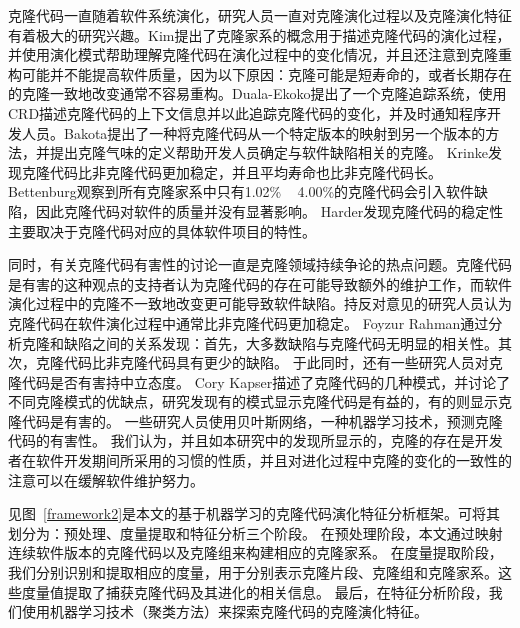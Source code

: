 克隆代码一直随着软件系统演化，研究人员一直对克隆演化过程以及克隆演化特征有着极大的研究兴趣。Kim提出了克隆家系的概念用于描述克隆代码的演化过程，并使用演化模式帮助理解克隆代码在演化过程中的变化情况，并且还注意到克隆重构可能并不能提高软件质量，因为以下原因：克隆可能是短寿命的，或者长期存在的克隆一致地改变通常不容易重构\cite{kim2005empirical}。Duala-Ekoko提出了一个克隆追踪系统，使用CRD描述克隆代码的上下文信息并以此追踪克隆代码的变化，并及时通知程序开发人员\cite{duala2010clone}。Bakota提出了一种将克隆代码从一个特定版本的映射到另一个版本的方法，并提出克隆气味的定义帮助开发人员确定与软件缺陷相关的克隆\cite{bakota2011tracking,bakota2007clone}。 Krinke发现克隆代码比非克隆代码更加稳定，并且平均寿命也比非克隆代码长\cite{krinke2008cloned}。 Bettenburg观察到所有克隆家系中只有1.02\% ~ 4.00\%的克隆代码会引入软件缺陷，因此克隆代码对软件的质量并没有显著影响\cite{bettenburg2009empirical}。  Harder发现克隆代码的稳定性主要取决于克隆代码对应的具体软件项目的特性\cite{harder2013cloned}。

同时，有关克隆代码有害性的讨论一直是克隆领域持续争论的热点问题。克隆代码是有害的这种观点的支持者认为克隆代码的存在可能导致额外的维护工作，而软件演化过程中的克隆不一致地改变更可能导致软件缺陷\cite{inoue2012experience}。持反对意见的研究人员认为克隆代码在软件演化过程中通常比非克隆代码更加稳定\cite{krinke2008cloned}。 Foyzur Ra​​hman通过分析克隆和缺陷之间的关系发现：首先，大多数缺陷与克隆代码无明显的相关性。其次，克隆代码比非克隆代码具有更少的缺陷\cite{rahman2012clones}。
 于此同时，还有一些研究人员对克隆代码是否有害持中立态度。  Cory Kapser描述了克隆代码的几种模式，并讨论了不同克隆模式的优缺点，研究发现有的模式显示克隆代码是有益的，有的则显示克隆代码是有害的\cite{kapser2006cloning}。  一些研究人员使用贝叶斯网络，一种机器学习技术，预测克隆代码的有害性\cite{wang2012can}。  我们认为，并且如本研究中的发现所显示的，克隆的存在是开发者在软件开发期间所采用的习惯的性质，并且对进化过程中克隆的变化的一致性的注意可以在缓解软件维护努力。


见图~\ref{framework2}是本文的基于机器学习的克隆代码演化特征分析框架。可将其划分为：预处理、度量提取和特征分析三个阶段。 在预处理阶段，本文通过映射连续软件版本的克隆代码以及克隆组来构建相应的克隆家系。 在度量提取阶段，我们分别识别和提取相应的度量，用于分别表示克隆片段、克隆组和克隆家系。这些度量值提取了捕获克隆代码及其进化的相关信息。 最后，在特征分析阶段，我们使用机器学习技术（聚类方法）来探索克隆代码的克隆演化特征。


